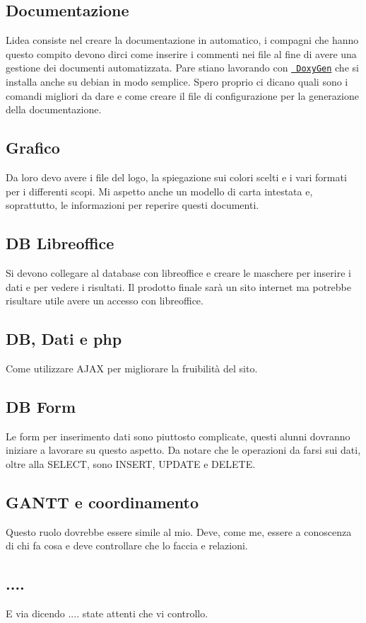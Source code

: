\subsection*{Documentazione}

L\textquotesingle{}idea consiste nel creare la documentazione in automatico, i compagni che hanno questo compito devono dirci come inserire i commenti nei file al fine di avere una gestione dei documenti automatizzata. Pare stiano lavorando con \href{http://doxygen.nl/}{\texttt{ Doxy\+Gen}} che si installa anche su debian in modo semplice. Spero proprio ci dicano quali sono i comandi migliori da dare e come creare il file di configurazione per la generazione della documentazione.

\subsection*{Grafico}

Da loro devo avere i file del logo, la spiegazione sui colori scelti e i vari formati per i differenti scopi. Mi aspetto anche un modello di carta intestata e, soprattutto, le informazioni per reperire questi documenti.

\subsection*{DB Libreoffice}

Si devono collegare al database con libreoffice e creare le maschere per inserire i dati e per vedere i risultati. Il prodotto finale sarà un sito internet ma potrebbe risultare utile avere un accesso con libreoffice.

\subsection*{DB, Dati e php}

Come utilizzare A\+J\+AX per migliorare la fruibilità del sito.

\subsection*{DB Form}

Le form per inserimento dati sono piuttosto complicate, questi alunni dovranno iniziare a lavorare su questo aspetto. Da notare che le operazioni da farsi sui dati, oltre alla S\+E\+L\+E\+CT, sono I\+N\+S\+E\+RT, U\+P\+D\+A\+TE e D\+E\+L\+E\+TE.

\subsection*{G\+A\+N\+TT e coordinamento}

Questo ruolo dovrebbe essere simile al mio. Deve, come me, essere a conoscenza di chi fa cosa e deve controllare che lo faccia e relazioni.

\subsection*{....}

E via dicendo .... state attenti che vi controllo. 